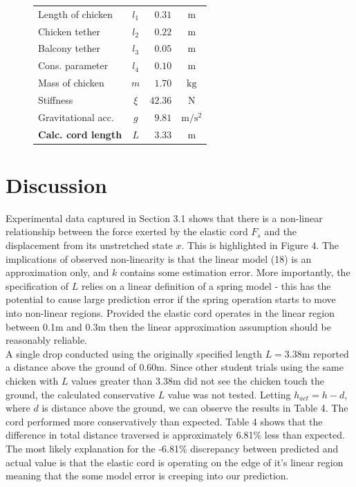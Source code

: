 \documentclass[a4paper]{article}
\begin{document}
\begin{figure}
\begin{minipage}[t]{0.45\textwidth}
\begin{tabular}{lcrc}
			Length of chicken & $l_1$ & $0.31$ & $\si{\meter}$ \\
			Chicken tether & $l_2$ & $0.22$ & $\si{\meter}$ \\
			Balcony tether & $l_3$ & $0.05$ & $\si{\meter}$ \\
			Cons. parameter & $l_4$ & $0.10$ & $\si{\meter}$ \\
			Mass of chicken & $m$ & $1.70$ & $\si{\kilogram}$ \\
			Stiffness & $\xi$ & $42.36$ & $\si{\newton}$ \\
			Gravitational acc. & $g$ & $9.81$ & $\si{\meter\per\second^2}$ \\
			\midrule
			\textbf{Calc. cord length} & $L$ & $3.33$ & $\si{\meter}$\\
			\bottomrule
		\end{tabular}
	\end{minipage}
\end{figure}


\section{Discussion}
Experimental data captured in Section 3.1 shows that there is a non-linear relationship between the force exerted by the elastic cord $F_s$ and the displacement from its unstretched state $x$. This is highlighted in Figure 4. The implications of observed non-linearity is that the linear model (18) is an approximation only, and $k$ contains some estimation error. More importantly, the specification of $L$ relies on a linear definition of a spring model - this has the potential to cause large prediction error if the spring operation starts to move into non-linear regions. Provided the elastic cord operates in the linear region between 0.1$\si{\meter}$ and 0.3$\si{\meter}$ then the linear approximation assumption should be reasonably reliable.\\

A single drop conducted using the originally specified length $L = 3.38\si{\meter}$ reported a distance above the ground of $0.60\si{\meter}$. Since other student trials using the same chicken with $L$ values greater than $3.38\si{\meter}$ did not see the chicken touch the ground, the calculated conservative $L$ value was not tested. Letting $h_{act} = h - d$, where $d$ is distance above the ground, we can observe the results in Table 4. The cord performed more conservatively than expected. Table 4 shows that the difference in total distance traversed is approximately 6.81\% less than expected. The most likely explanation for the -6.81\% discrepancy between predicted and actual value is that the elastic cord is operating on the edge of it's linear region meaning that the some model error is creeping into our prediction.
\end{document}

